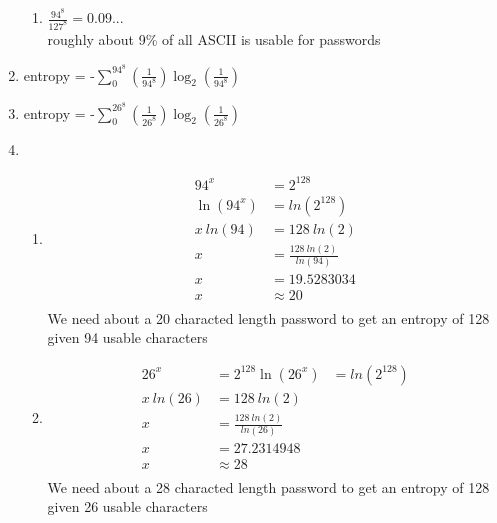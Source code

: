 \documentclass{assignment}
\begin{document}
\begin{problemlist}
\begin{problem}
\begin{answer}
\begin{enumerate}[label=(\alph*)]
\begin{enumerate}[label=(\roman*)]
			\item $\frac{94^8}{127^8} = 0.09... $ \\
				  roughly about 9\% of all ASCII is usable for passwords
			\end{enumerate}
	\item entropy = -$\sum_{0}^{94^8} (\frac{1}{94^8})  \log_2(\frac{1}{94^8})$ 
	\item entropy = -$\sum_{0}^{26^8} (\frac{1}{26^8})  \log_2(\frac{1}{26^8})$
	\item 	\begin{enumerate}[label=(\roman*)]
			\item 
				  \begin{align*}
					94^x &= 2^{128}  \\
				 	\ln(94^x) &= ln(2^{128}) \\
				  	x \: ln(94) &= 128 \: ln(2) \\
				  	x &= \frac{128 \: ln(2)}{ln(94)} \\
				  	x &= 19.5283034 \\
				  	x &\approx 20 \\
				  \end{align*}
				  	We need about a 20 characted length password to get an entropy of 128 given 94 usable characters
			\item 	\begin{align*}
						26^x &= 2^{128}
						\ln(26^x) &= ln(2^{128}) \\
				  		x \: ln(26) &= 128 \: ln(2) \\
				  		x &= \frac{128 \: ln(2)}{ln(26)} \\
				  		x &= 27.2314948 \\
				  		x &\approx 28 \\
					\end{align*}
					We need about a 28 characted length password to get an entropy of 128 given 26 usable characters
			\end{enumerate}
\end{enumerate}
\end{answer}
\end{problem}

\end{problemlist}
\end{document}
